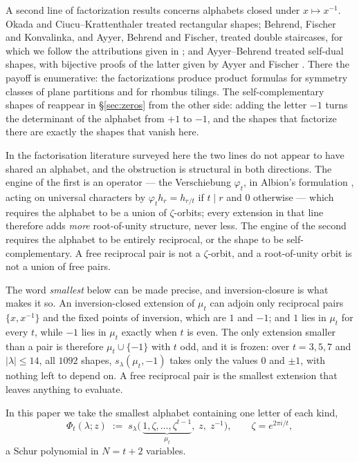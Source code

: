 \documentclass[11pt,reqno]{amsart}
\theoremstyle{plain}
\theoremstyle{definition}
\newcommand{\zt}{\mu_t}
\begin{document}
A second line of factorization results concerns alphabets closed under $x\mapsto x^{-1}$. Okada
\cite{Oka98} and Ciucu--Krattenthaler \cite{CK09} treated rectangular shapes; Behrend, Fischer and
Konvalinka, and Ayyer, Behrend and Fischer, treated double staircases, for which we follow the
attributions given in \cite{AB19}; and Ayyer--Behrend
\cite{AB19} treated self-dual shapes, with bijective proofs of the latter given by Ayyer and Fischer
\cite{AF20}. There the payoff is enumerative: the factorizations produce
product formulas for symmetry classes of plane partitions and for rhombus tilings. The
self-complementary shapes of \cite{AB19} reappear in \S\ref{sec:zeros} from the other side: adding
the letter $-1$ turns the determinant of the alphabet from $+1$ to $-1$, and the shapes that
factorize there are exactly the shapes that vanish here.

In the factorisation literature surveyed here the two lines do not appear to have shared an
alphabet, and the obstruction is structural in both directions.
The engine of the first is an operator --- the Verschiebung $\varphi_t$, in Albion's formulation
\cite{Alb23}, acting on universal characters by $\varphi_t h_r=h_{r/t}$ if $t\mid r$ and $0$
otherwise --- which requires the alphabet to be a union of $\zeta$-orbits; every extension in that
line therefore adds \emph{more} root-of-unity structure, never less. The engine of the second
requires the alphabet to be entirely reciprocal, or the shape to be self-complementary. A free
reciprocal pair is not a $\zeta$-orbit, and a root-of-unity orbit is not a union of free pairs.

The word \emph{smallest} below can be made precise, and inversion-closure is what makes it so. An
inversion-closed extension of $\zt$ can adjoin only reciprocal pairs $\{x,x^{-1}\}$ and the fixed
points of inversion, which are $1$ and $-1$; and $1$ lies in $\zt$ for every $t$, while $-1$ lies in
$\zt$ exactly when $t$ is even. The only extension smaller than a pair is therefore $\zt\cup\{-1\}$
with $t$ odd, and it is frozen: over $t=3,5,7$ and $|\lambda|\le14$, all $1092$ shapes,
$s_\lambda(\zt,-1)$ takes only the values $0$ and $\pm1$, with nothing left to depend on. A free
reciprocal pair is the smallest extension that leaves anything to evaluate.

In this paper we take the smallest alphabet containing one letter of each kind,
\begin{equation}\label{eq:object}
\Phi_t(\lambda;z)\;:=\;s_\lambda\bigl(\,\underbrace{1,\zeta,\dots,\zeta^{t-1}}_{\zt},\;z,\;z^{-1}\bigr),
\qquad \zeta=e^{2\pi i/t},
\end{equation}
a Schur polynomial in $N=t+2$ variables.
\end{document}
